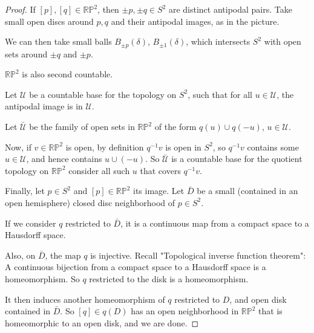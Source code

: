 \begin{example}
\begin{enumerate}
\begin{proof}
            If \([p],[q] \in \mathbb{RP}^2\), then \(\pm p, \pm q \in S^2\) are distinct antipodal pairs. Take small open discs around \(p,q\) and their antipodal images, as in the picture.

            We can then take small balls \(B_{\pm p}(\delta)\), \(B_{\pm 1}(\delta)\), which intersects \(S^2\) with open sets around \(\pm q\) and \(\pm p\).

            \(\mathbb{RP}^2\) is also second countable.

            Let \(\mathcal{U} \) be a countable base for the topology on \(S^2\), such that for all \(u \in \mathcal{U} \), the antipodal image is in \(\mathcal{U} \).

            Let \(\bar{\mathcal{U} }\) be the family of open sets in \(\mathbb{RP}^2\) of the form \(q(u) \cup q(-u)\), \(u \in \mathcal{U} \).

            Now, if \(v \in \mathbb{RP}^2\) is open, by definition \(q^{-1}v\) is open in \(S^2\), so \(q^{-1}v\) contains some \(u\in \mathcal{U} \), and hence contains \(u \cup (-u)\). So \(\bar{\mathcal{U}}\) is a countable base for the quotient topology on \(\mathbb{RP}^2\) consider all such \(u\) that covers \(q^{-1}v\).

            Finally, let \(p \in S^2\) and \([p] \in \mathbb{RP}^2\) its image. Let \(\bar{D}\) be a small (contained in an open hemisphere) closed disc neighborhood of \(p \in S^2\).

            If we consider \(q\) restricted to \(\bar{D}\), it is a continuous map from a compact space to a Hausdorff space.

            Also, on \(\bar{D}\), the map \(q\) is injective. Recall "Topological inverse function theorem": A continuous bijection from a compact space to a Hausdorff space is a homeomorphism. So \(q\) restricted to the disk is a homeomorphism.

            It then induces another homeomorphism of \(q\) restricted to \(D\), and open disk contained in \(\bar{D}\). So \([q]\in q(D)\) has an open neighborhood in \(\mathbb{RP}^2\) that is homeomorphic to an open disk, and we are done.
        \end{proof}
    \end{enumerate}
\end{example}